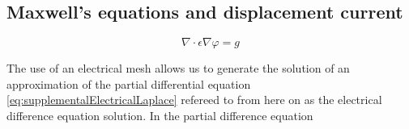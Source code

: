 \subsection{Maxwell's equations and displacement current}\label{section:maxwellDisplacement}


\begin{equation}\label{eq:supplementalElectricalLaplaceCHANGE}
  \nabla \cdot \epsilon \nabla \varphi = g 
\end{equation}

The use of an electrical mesh allows us to generate the solution of an approximation of the partial differential equation \ref{eq:supplementalElectricalLaplace} refereed to from here on as the electrical difference equation solution. In the partial difference equation